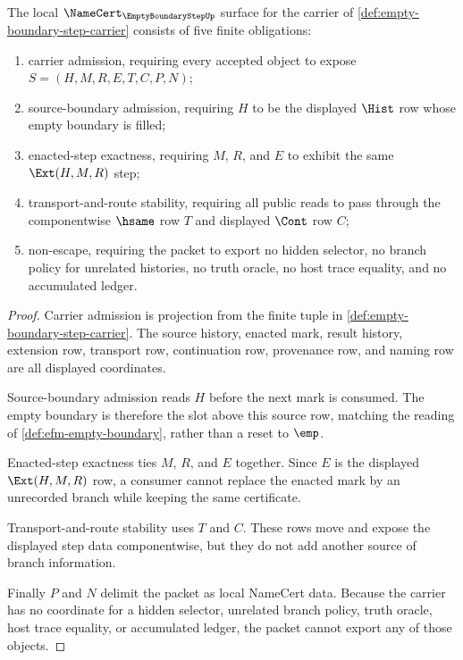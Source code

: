 \begin{theorem}
\label{thm:empty-boundary-step-namecert-obligations}
The local $\NameCert_{\EmptyBoundaryStepUp}$ surface for the carrier of \autoref{def:empty-boundary-step-carrier} consists of five finite obligations:
\begin{enumerate}
\item carrier admission, requiring every accepted object to expose $S=(H,M,R,E,T,C,P,N)$;
\item source-boundary admission, requiring $H$ to be the displayed $\Hist$ row whose empty boundary is filled;
\item enacted-step exactness, requiring $M$, $R$, and $E$ to exhibit the same $\Ext(H,M,R)$ step;
\item transport-and-route stability, requiring all public reads to pass through the componentwise $\hsame$ row $T$ and displayed $\Cont$ row $C$;
\item non-escape, requiring the packet to export no hidden selector, no branch policy for unrelated histories, no truth oracle, no host trace equality, and no accumulated ledger.
\end{enumerate}
\end{theorem}
\begin{proof}
Carrier admission is projection from the finite tuple in \autoref{def:empty-boundary-step-carrier}. The source history, enacted mark, result history, extension row, transport row, continuation row, provenance row, and naming row are all displayed coordinates.

Source-boundary admission reads $H$ before the next mark is consumed. The empty boundary is therefore the slot above this source row, matching the reading of \autoref{def:efm-empty-boundary}, rather than a reset to $\emp$.

Enacted-step exactness ties $M$, $R$, and $E$ together. Since $E$ is the displayed $\Ext(H,M,R)$ row, a consumer cannot replace the enacted mark by an unrecorded branch while keeping the same certificate.

Transport-and-route stability uses $T$ and $C$. These rows move and expose the displayed step data componentwise, but they do not add another source of branch information.

Finally $P$ and $N$ delimit the packet as local NameCert data. Because the carrier has no coordinate for a hidden selector, unrelated branch policy, truth oracle, host trace equality, or accumulated ledger, the packet cannot export any of those objects.
\end{proof}


